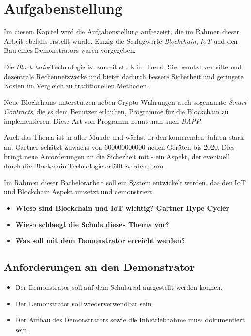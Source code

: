 \chapter{Aufgabenstellung}
\label{cha:Aufgabenstellung}

Im diesem Kapitel wird die Aufgabenstellung aufgezeigt, die im Rahmen dieser 
Arbeit ebefalls erstellt wurde. Einzig die Schlagworte \emph{Blockchain},
\emph{\acrfull{IoT}} und den Bau eines Demonstrators waren vorgegeben.

Die \emph{Blockchain}-Technologie ist zurzeit stark im Trend. Sie benutzt verteilte
und dezentrale Rechennetzwerke und bietet dadurch bessere Sicherheit und geringere 
Kosten im Vergleich zu traditionellen Methoden.

Neue Blockchains unterstützen neben Crypto-Währungen auch sogenannte \emph{Smart Contracts},
die es dem Benutzer erlauben, Programme für die Blockchain zu implementieren. Diese
Art von Programm nennt man auch \emph{\acrfull{DAPP}}.

Auch das Thema  ist in aller Munde und wächst in den kommenden Jahren stark an. Gartner 
schätzt Zuwachs von 600000000000 neuen Geräten bis 2020. Dies bringt neue Anforderungen an
die Sicherheit mit - ein Aspekt, der eventuell durch die Blockchain-Technologie erfüllt
werden kann.

Im Rahmen dieser Bachelorarbeit soll ein System entwickelt werden, das den IoT und Blockchain Aspekt
umsetzt und demonstriert.

\begin{itemize}
    \item \textbf{ Wieso sind Blockchain und IoT wichtig? Gartner Hype Cycler}
    \item \textbf{ Wieso schlaegt die Schule dieses Thema vor? }
    \item \textbf{ Was soll mit dem Demonstrator erreicht werden? }
\end{itemize}

\section{Anforderungen an den Demonstrator}
\label{sec:Anforderungen an den Demonstrator}
\begin{itemize}
    \item Der Demonstrator soll auf dem Schulareal ausgestellt werden können. 
    \item Der Demonstrator soll wiederverwendbar sein.
    \item Der Aufbau des Demonstrators sowie die Inbetriebnahme muss dokumentiert sein.
\end{itemize}

